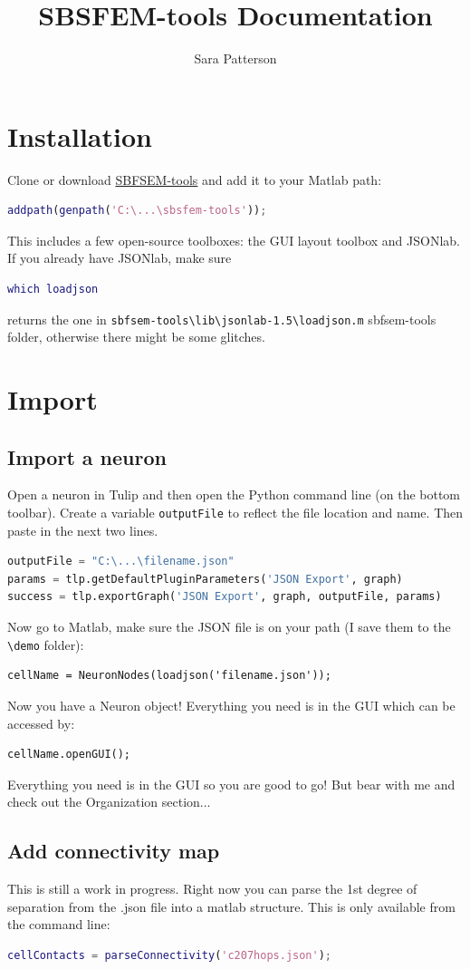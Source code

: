 \documentclass[]{exam}
\title{SBSFEM-tools Documentation}
\author{Sara Patterson}
\begin{document}
	\maketitle
	\tableofcontents
	\section{Installation}
		Clone or download \href{https://github.com/sarastokes/sbfsem-tools}{SBFSEM-tools} and add it to your Matlab path:
		\begin{lstlisting}[language=matlab]
addpath(genpath('C:\...\sbsfem-tools'));\end{lstlisting}
		This includes a few open-source toolboxes: the GUI layout toolbox and JSONlab. If you already have JSONlab, make sure 
		\begin{lstlisting}[language=matlab] 
which loadjson \end{lstlisting} 
		returns the one in \verb|sbfsem-tools\lib\jsonlab-1.5\loadjson.m| sbfsem-tools folder, otherwise there might be some glitches.
	\section{Import}
		\subsection{Import a neuron}
			Open a neuron in Tulip and then open the Python command line (on the bottom toolbar). Create a variable \verb|outputFile| to reflect the file location and name. Then paste in the next two lines.
			\begin{lstlisting}[language=python]
outputFile = "C:\...\filename.json"
params = tlp.getDefaultPluginParameters('JSON Export', graph)
success = tlp.exportGraph('JSON Export', graph, outputFile, params)\end{lstlisting}
			Now go to Matlab, make sure the JSON file is on your path (I save them to the \verb|\demo| folder):
			\begin{lstlisting}
cellName = NeuronNodes(loadjson('filename.json'));\end{lstlisting}
			Now you have a Neuron object! Everything you need is in the GUI which can be accessed by:
			\begin{lstlisting}
cellName.openGUI();\end{lstlisting}
			Everything you need is in the GUI so you are good to go! But bear with me and check out the Organization section...
		\subsection{Add connectivity map}
			This is still a work in progress. Right now you can parse the 1st degree of separation from the .json file into a matlab structure. This is only available from the command line:
			\begin{lstlisting}[language=matlab]
cellContacts = parseConnectivity('c207hops.json');\end{lstlisting}
\end{document}
